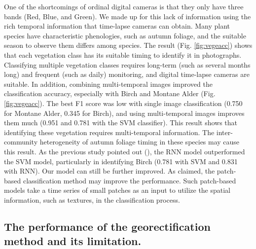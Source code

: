 \documentclass{article}
\begin{document}
One of the shortcomings of ordinal digital cameras is that they only have three bands (Red, Blue, and Green). We made up for this lack of information using the rich temporal information that time-lapse cameras can obtain. Many plant species have characteristic phenologies, such as autumn foliage, and the suitable season to observe them differs among species. The result (Fig. \ref{fig:vegeacc}) shows that each vegetation class has its suitable timing to identify it in photographs. Classifying multiple vegetation classes requires long-term (such as several months long) and frequent (such as daily) monitoring, and digital time-lapse cameras are suitable. In addition, combining multi-temporal images improved the classification accuracy, especially with Birch and Montane Alder (Fig. \ref{fig:vegeacc}). The best F1 score was low with single image classification (0.750 for Montane Alder, 0.345 for Birch), and using multi-temporal images improves them much (0.951 and 0.781 with the SVM classifier). This result shows that identifying these vegetation requires multi-temporal information. The inter-community heterogeneity of autumn foliage timing in these species may cause this result. As the previous study pointed out (\cite{Ienco2017RemSenLSTM}), the RNN model outperformed the SVM model, particularly in identifying Birch (0.781 with SVM and 0.831 with RNN). Our model can still be further improved. As \cite{Sharma2018NN} claimed, the patch-based classification method may improve the performance. Such patch-based models take a time series of small patches as an input to utilize the spatial information, such as textures, in the classification process.

\hypertarget{the-performance-of-the-georectification-method-and-its-limitation.}{%
\subsection{The performance of the georectification method and its limitation.}\label{the-performance-of-the-georectification-method-and-its-limitation.}}
\end{document}
